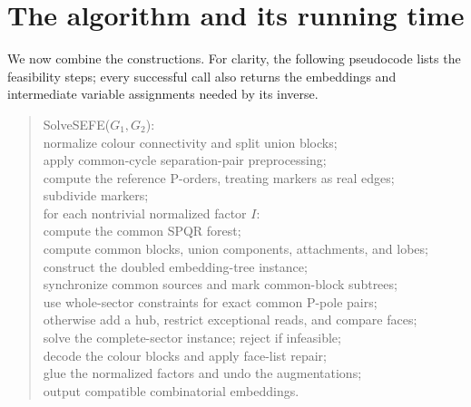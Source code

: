 \section{The algorithm and its running time}
\label{sec:composition}

We now combine the constructions.  For clarity, the following pseudocode
lists the feasibility steps; every successful call also returns the
embeddings and intermediate variable assignments needed by its inverse.
\begin{quote}\small\ttfamily
SolveSEFE($G_1,G_2$):\\
\quad normalize colour connectivity and split union blocks;\\
\quad apply common-cycle separation-pair preprocessing;\\
\quad compute the reference P-orders, treating markers as real edges;\\
\quad subdivide markers;\\
\quad for each nontrivial normalized factor $I$: \\
\qquad compute the common SPQR forest;\\
\qquad compute common blocks, union components, attachments, and lobes;\\
\qquad construct the doubled embedding-tree instance;\\
\qquad synchronize common sources and mark common-block subtrees;\\
\qquad use whole-sector constraints for exact common P-pole pairs;\\
\qquad otherwise add a hub, restrict exceptional reads, and compare faces;\\
\qquad solve the complete-sector instance; reject if infeasible;\\
\qquad decode the colour blocks and apply face-list repair;\\
\quad glue the normalized factors and undo the augmentations;\\
\quad output compatible combinatorial embeddings.
\end{quote}

